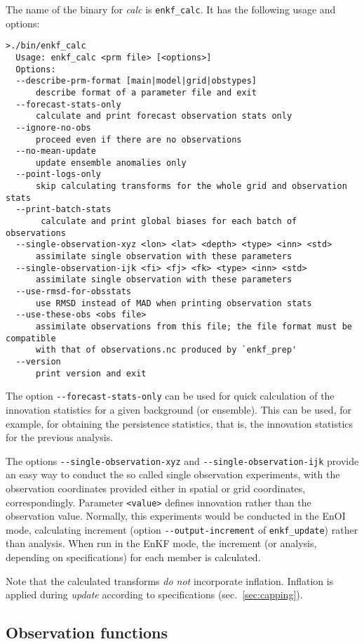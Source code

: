 \documentclass[11pt]{report}
\begin{document}
The name of the binary for \emph{calc} is \verb|enkf_calc|.
It has the following usage and options:
\begin{Verbatim}[frame=single,fontsize=\footnotesize]
>./bin/enkf_calc 
  Usage: enkf_calc <prm file> [<options>]
  Options:
  --describe-prm-format [main|model|grid|obstypes]
      describe format of a parameter file and exit
  --forecast-stats-only
      calculate and print forecast observation stats only
  --ignore-no-obs
      proceed even if there are no observations
  --no-mean-update
      update ensemble anomalies only
  --point-logs-only
      skip calculating transforms for the whole grid and observation stats
  --print-batch-stats
       calculate and print global biases for each batch of observations
  --single-observation-xyz <lon> <lat> <depth> <type> <inn> <std>
      assimilate single observation with these parameters
  --single-observation-ijk <fi> <fj> <fk> <type> <inn> <std>
      assimilate single observation with these parameters
  --use-rmsd-for-obsstats
      use RMSD instead of MAD when printing observation stats
  --use-these-obs <obs file>
      assimilate observations from this file; the file format must be compatible
      with that of observations.nc produced by `enkf_prep'
  --version
      print version and exit
\end{Verbatim}

The option \verb|--forecast-stats-only| can be used for quick calculation of the innovation statistics for a given background (or ensemble).
This can be used, for example, for obtaining the persistence statistics, that is, the innovation statistics for the previous analysis.

The options \verb|--single-observation-xyz| and \verb|--single-observation-ijk| provide an easy way to conduct the so called single observation experiments, with the observation coordinates provided either in spatial or grid coordinates, correspondingly.
Parameter \verb|<value>| defines innovation rather than the observation value.
Normally, this experiments would be conducted in the EnOI mode, calculating increment (option \verb|--output-increment| of \verb|enkf_update|) rather than analysis.
When run in the EnKF mode, the increment (or analysis, depending on specifications) for each member is calculated.

Note that the calculated transforms \emph{do not} incorporate inflation.
Inflation is applied during \emph{update} according to specifications (sec.~\ref{sec:capping}).

\subsection{Observation functions}
\label{sec:hfunctions}
\end{document}
